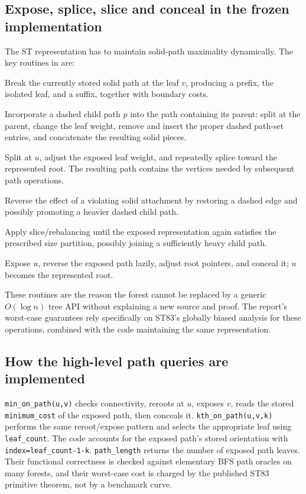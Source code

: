 \subsection{Expose, splice, slice and conceal in the frozen implementation}
The ST representation has to maintain solid-path maximality dynamically.  The key routines in  are:
\begin{description}[leftmargin=3cm,style=nextline]
\item[\texttt{split\_vertex(v)}] Break the currently stored solid path at the leaf \(v\), producing a prefix, the isolated leaf, and a suffix, together with boundary costs.
\item[\texttt{splice(p)}] Incorporate a dashed child path \(p\) into the path containing its parent: split at the parent, change the leaf weight, remove and insert the proper dashed path-set entries, and concatenate the resulting solid pieces.
\item[\texttt{expose(u)}] Split at \(u\), adjust the exposed leaf weight, and repeatedly splice toward the represented root.  The resulting path contains the vertices needed by subsequent path operations.
\item[\texttt{slice(p)}] Reverse the effect of a violating solid attachment by restoring a dashed edge and possibly promoting a heavier dashed child path.
\item[\texttt{conceal(p)}] Apply slice/rebalancing until the exposed representation again satisfies the prescribed size partition, possibly joining a sufficiently heavy child path.
\item[\texttt{evert(u)}] Expose \(u\), reverse the exposed path lazily, adjust root pointers, and conceal it; \(u\) becomes the represented root.
\end{description}
These routines are the reason the forest cannot be replaced by a generic \(O(\log n)\) tree API without explaining a new source and proof.  The report's worst-case guarantees rely specifically on ST83's globally biased analysis for these operations, combined with the code maintaining the same representation.

\subsection{How the high-level path queries are implemented}
\texttt{min\_on\_path(u,v)} checks connectivity, reroots at \(u\), exposes \(v\), reads the stored \texttt{minimum\_cost} of the exposed path, then conceals it.  \texttt{kth\_on\_path(u,v,k)} performs the same reroot/expose pattern and selects the appropriate leaf using \texttt{leaf\_count}.  The code accounts for the exposed path's stored orientation with \texttt{index=leaf\_count-1-k}.  \texttt{path\_length} returns the number of exposed path leaves.  Their functional correctness is checked against elementary BFS path oracles on many forests, and their worst-case cost is charged by the published ST83 primitive theorem, not by a benchmark curve.

